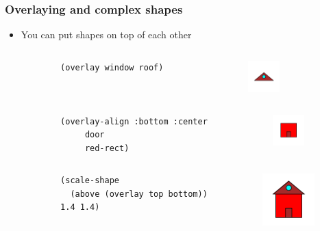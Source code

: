 \documentclass{beamer}
\begin{document}
\begin{frame}[fragile]
	\frametitle{Overlaying and complex shapes}
	\begin{itemize}
	\item You can put shapes on top of each other 
	\begin{columns}[t]
		\begin{column}{.45\textwidth}
		\begin{verbatim}
		(overlay window roof)
		\end{verbatim}
		\end{column}
		\begin{column}{.3\textwidth}
		\begin{figure}[h]
			\includegraphics[width=1.22cm]{PresentationImages/roof.png}
			\end{figure}		
		\end{column}
		\end{columns} 
		\begin{columns}[t]
		\begin{column}{.45\textwidth}
		\begin{verbatim}
		(overlay-align :bottom :center 
		     door 
		     red-rect)
		\end{verbatim}
		\end{column}
		\begin{column}{.3\textwidth}
		\begin{figure}[h]
			\includegraphics[width=1.2cm]{PresentationImages/body.png}
			\end{figure}		
		\end{column}
		\end{columns} 
		\begin{columns}[t]
		\begin{column}{.45\textwidth}
		\begin{verbatim}
		(scale-shape 
		  (above (overlay top bottom)) 
		1.4 1.4)

		\end{verbatim}
		\end{column}
		\begin{column}{.3\textwidth}
		\begin{figure}[h]
			\includegraphics[width=2cm]{PresentationImages/house.png}
			\end{figure}		
		\end{column}
		\end{columns}
	\end{itemize}
	
\end{frame}
\end{document}
